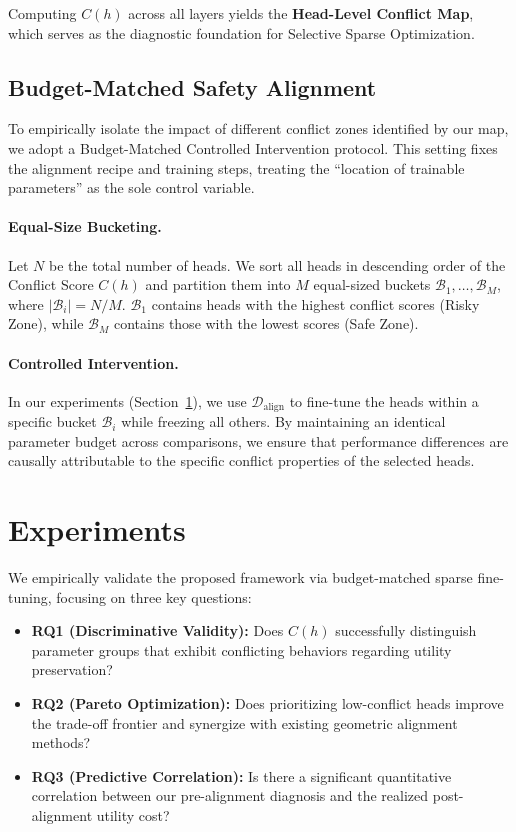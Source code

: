 \documentclass[11pt]{article}
\begin{document}
Computing $C(h)$ across all layers yields the \textbf{Head-Level Conflict Map}, which serves as the diagnostic foundation for Selective Sparse Optimization.

\subsection{Budget-Matched Safety Alignment}
To empirically isolate the impact of different conflict zones identified by our map, we adopt a Budget-Matched Controlled Intervention protocol. This setting fixes the alignment recipe and training steps, treating the ``location of trainable parameters'' as the sole control variable.

\paragraph{Equal-Size Bucketing.} Let $N$ be the total number of heads. We sort all heads in descending order of the Conflict Score $C(h)$ and partition them into $M$ equal-sized buckets $\mathcal{B}_1, \dots, \mathcal{B}_M$, where $|\mathcal{B}_i| = N/M$. $\mathcal{B}_1$ contains heads with the highest conflict scores (Risky Zone), while $\mathcal{B}_M$ contains those with the lowest scores (Safe Zone).

\paragraph{Controlled Intervention.} In our experiments (Section~\ref{sec:experiments}), we use $\mathcal{D}_{\text{align}}$ to fine-tune the heads within a specific bucket $\mathcal{B}_i$ while freezing all others. By maintaining an identical parameter budget across comparisons, we ensure that performance differences are causally attributable to the specific conflict properties of the selected heads.


\section{Experiments}
\label{sec:experiments}

We empirically validate the proposed framework via budget-matched sparse fine-tuning, focusing on three key questions:
\begin{itemize}[leftmargin=*,itemsep=2pt, topsep=0pt, parsep=0pt]
    \setlength{\itemsep}{0pt}
    \setlength{\parsep}{0pt}
    \setlength{\topsep}{0pt}
    
    \item \textbf{RQ1 (Discriminative Validity):} Does $C(h)$ successfully distinguish parameter groups that exhibit conflicting behaviors regarding utility preservation?
    
    \item \textbf{RQ2 (Pareto Optimization):} Does prioritizing low-conflict heads improve the trade-off frontier and synergize with existing geometric alignment methods?

    \item \textbf{RQ3 (Predictive Correlation):} Is there a significant quantitative correlation between our pre-alignment diagnosis and the realized post-alignment utility cost?
\end{itemize}
\end{document}

